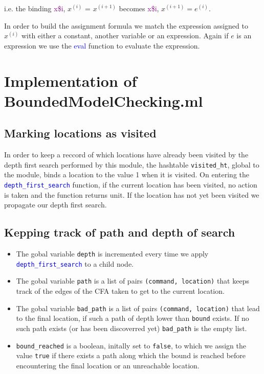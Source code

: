 \documentclass[letterpaper,12pt]{article}
\begin{document}
i.e. the binding \textcolor{purple}{x\$i}, $x^{(i)}$ = $x^{(i+1)}$ becomes \textcolor{purple}{x\$i}, $x^{(i+1)} = e^{(i)}$.

In order to build the assignment formula we match the expression assigned to $x^{(i)}$ with either a constant, another variable or an expression. Again if $e$ is an expression we use the \textcolor{blue}{eval} function to evaluate the expression.

  
\section{Implementation of BoundedModelChecking.ml}
\subsection{Marking locations as visited}
In order to keep a reccord of which locations have already been visited by the depth first search performed by this module, the hashtable \texttt{visited\_ht}, global to the module, binds a location to the value 1 when it is visited. On entering the \texttt{\textcolor{blue}{depth\_first\_search}} function, if the current location has been visited, no action is taken and the function returns unit. If the location has not yet been visited we propagate our depth first search.


\subsection{Kepping track of path and depth of search}

\begin{itemize}
\item The gobal variable \texttt{depth} is incremented every time we apply \texttt{\textcolor{blue}{depth\_first\_search}} to a child node.
\item The gobal variable \texttt{path} is a list of pairs \texttt{(command, location)} that keeps track of the edges of the CFA taken to get to the current location.
\item The gobal variable \texttt{bad\_path} is a list of pairs \texttt{(command, location)} that lead to the final location, if such a path of depth lower than \texttt{bound} exists. If no such path exists (or has been discoverred yet) \texttt{bad\_path} is the empty list.
\item \texttt{bound\_reached} is a boolean, initally set to \texttt{false}, to which we assign the value \texttt{true} if there exists a path along which the bound is reached before encountering the final location or an unreachable location.
\end{itemize}
\end{document}

